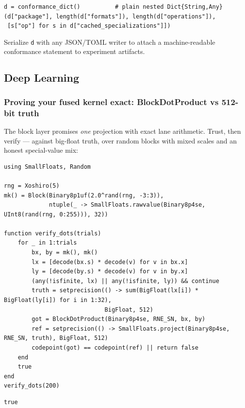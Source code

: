 \begin{verbatim}
d = conformance_dict()          # plain nested Dict{String,Any}
(d["package"], length(d["formats"]), length(d["operations"]),
 [s["op"] for s in d["cached_specializations"]])
\end{verbatim}



Serialize \texttt{d} with any JSON/TOML writer to attach a machine-readable conformance statement to experiment artifacts.



\subsection{Deep Learning}



\label{15209394077164581735-dup2}{}


\subsubsection{Proving your fused kernel exact: BlockDotProduct vs 512-bit truth}



\label{13954472669056568806}{}


The block layer promises \emph{one} projection with exact lane arithmetic. Trust, then verify — against big-float truth, over random blocks with mixed scales and an honest special-value mix:




\nopagebreak[4]
\begin{minipage}{\linewidth}
\begin{verbatim}
using SmallFloats, Random

rng = Xoshiro(5)
mk() = Block(Binary8p1uf(2.0^rand(rng, -3:3)),
             ntuple(_ -> SmallFloats.rawvalue(Binary8p4se, UInt8(rand(rng, 0:255))), 32))

function verify_dots(trials)
    for _ in 1:trials
        bx, by = mk(), mk()
        lx = [decode(bx.s) * decode(v) for v in bx.x]
        ly = [decode(by.s) * decode(v) for v in by.x]
        (any(!isfinite, lx) || any(!isfinite, ly)) && continue
        truth = setprecision(() -> sum(BigFloat(lx[i]) * BigFloat(ly[i]) for i in 1:32),
                             BigFloat, 512)
        got = BlockDotProduct(Binary8p4se, RNE_SN, bx, by)
        ref = setprecision(() -> SmallFloats.project(Binary8p4se, RNE_SN, truth), BigFloat, 512)
        codepoint(got) == codepoint(ref) || return false
    end
    true
end
verify_dots(200)
\end{verbatim}




\begin{verbatim}
true
\end{verbatim}
\end{minipage}




